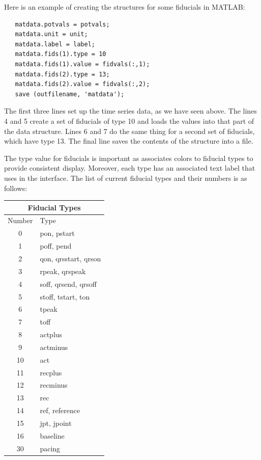 Here is an example of creating the structures for some fiducials in MATLAB:
%
\begin{verbatim}
   matdata.potvals = potvals;
   matdata.unit = unit;
   matdata.label = label;
   matdata.fids(1).type = 10
   matdata.fids(1).value = fidvals(:,1);
   matdata.fids(2).type = 13;
   matdata.fids(2).value = fidvals(:,2);
   save (outfilename, 'matdata');
\end{verbatim}

The first three lines set up the time series data, as we have seen above.
The lines 4 and 5 create a set of fiducials of type 10 and loads the values
into that part of the data structure.  Lines 6 and 7 do the same thing for
a second set of fiducials, which have type 13. The final line saves the
contents of the structure into a file.

The type value for fiducials is important as \map{} associates colors to
fiducial types to provide consistent display.  Moreover, each type has an
associated text label that \map{} uses in the interface.  The list of
current fiducial types and their numbers is as follows:

\bigskip

\begin{center}
\begin{tabular}[h]{|c|l|} \hline
\multicolumn{2}{|c|}{Fiducial Types} \\  \hline \hline
Number & Type \\ \hline 
 0 & pon, pstart \\
 1 & poff, pend \\
 2 & qon, qrsstart, qrson \\
 3 & rpeak, qrspeak \\
 4 & soff, qrsend, qrsoff \\
 5 & stoff, tstart, ton \\
 6 & tpeak \\
 7 & toff \\
 8 & actplus \\
 9 & actminus \\
 10 & act \\
 11 & recplus \\
 12 & recminus \\
 13 & rec \\
 14 & ref, reference \\
 15 & jpt, jpoint \\
 16 & baseline \\
 30 & pacing \\
\hline
\end{tabular}
\end{center}

